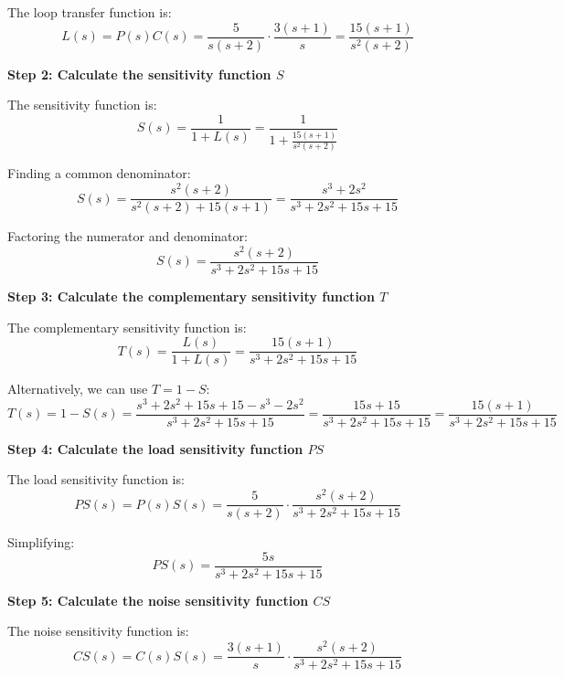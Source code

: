\documentclass[11pt,a4paper]{article}
\begin{document}
The loop transfer function is:
\begin{equation}
  L(s) = P(s)C(s) = \frac{5}{s(s+2)} \cdot \frac{3(s+1)}{s} = \frac{15(s+1)}{s^2(s+2)}
\end{equation}

\textbf{Step 2: Calculate the sensitivity function $S$}

The sensitivity function is:
\begin{equation}
  S(s) = \frac{1}{1 + L(s)} = \frac{1}{1 + \frac{15(s+1)}{s^2(s+2)}}
\end{equation}

Finding a common denominator:
\begin{equation}
  S(s) = \frac{s^2(s+2)}{s^2(s+2) + 15(s+1)} = \frac{s^3 + 2s^2}{s^3 + 2s^2 + 15s + 15}
\end{equation}

Factoring the numerator and denominator:
\begin{equation}
  S(s) = \frac{s^2(s+2)}{s^3 + 2s^2 + 15s + 15}
\end{equation}

\textbf{Step 3: Calculate the complementary sensitivity function $T$}

The complementary sensitivity function is:
\begin{equation}
  T(s) = \frac{L(s)}{1 + L(s)} = \frac{15(s+1)}{s^3 + 2s^2 + 15s + 15}
\end{equation}

Alternatively, we can use $T = 1 - S$:
\begin{equation}
  T(s) = 1 - S(s) = \frac{s^3 + 2s^2 + 15s + 15 - s^3 - 2s^2}{s^3 + 2s^2 + 15s + 15} = \frac{15s + 15}{s^3 + 2s^2 + 15s + 15} = \frac{15(s+1)}{s^3 + 2s^2 + 15s + 15}
\end{equation}

\textbf{Step 4: Calculate the load sensitivity function $PS$}

The load sensitivity function is:
\begin{equation}
  PS(s) = P(s)S(s) = \frac{5}{s(s+2)} \cdot \frac{s^2(s+2)}{s^3 + 2s^2 + 15s + 15}
\end{equation}

Simplifying:
\begin{equation}
  PS(s) = \frac{5s}{s^3 + 2s^2 + 15s + 15}
\end{equation}

\textbf{Step 5: Calculate the noise sensitivity function $CS$}

The noise sensitivity function is:
\begin{equation}
  CS(s) = C(s)S(s) = \frac{3(s+1)}{s} \cdot \frac{s^2(s+2)}{s^3 + 2s^2 + 15s + 15}
\end{equation}
\end{document}
